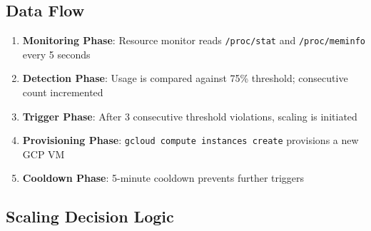 \documentclass[12pt,a4paper]{article}
\begin{document}
\subsection{Data Flow}

\begin{enumerate}
    \item \textbf{Monitoring Phase}: Resource monitor reads \texttt{/proc/stat} and \texttt{/proc/meminfo} every 5 seconds
    \item \textbf{Detection Phase}: Usage is compared against 75\% threshold; consecutive count incremented
    \item \textbf{Trigger Phase}: After 3 consecutive threshold violations, scaling is initiated
    \item \textbf{Provisioning Phase}: \texttt{gcloud compute instances create} provisions a new GCP VM
    \item \textbf{Cooldown Phase}: 5-minute cooldown prevents further triggers
\end{enumerate}

\subsection{Scaling Decision Logic}
\end{document}
